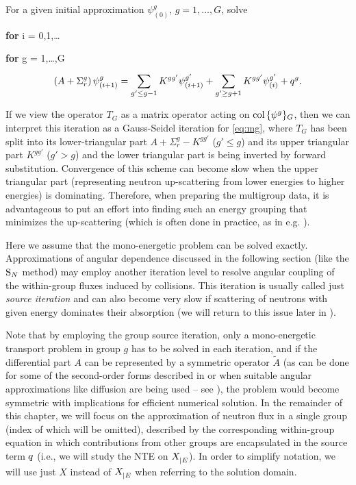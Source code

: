 For a given
initial approximation $\psi^g_{(0)}$, $g = 1,\ldots,G$, solve
\begin{myitemize}
  \item \textbf{for} i = 0,1,\ldots
  \begin{myitemize}
  \item \textbf{for} g = 1,\ldots,G
  \vspace*{-.5em}
	\begin{equation}\label{eq:MGGS}
		\left(A + \Sigma_r^g\right)\psi^g_{(i+1)} = \sum_{g'\leq g-1}^{} K^{gg'}\psi^{g'}_{(i+1)} + \sum_{g' \geq g+1}^{}
	  K^{gg'}\psi^{g'}_{(i)} + q^g.
	\end{equation}  
 \end{myitemize}
\end{myitemize}
If we view the operator $T_G$ as a matrix operator acting on $\operatorname{col\,} \{\psi^g\}_G$, then we can interpret
this iteration as a Gauss-Seidel iteration for \eqref{eq:mg}, where $T_G$
has been split into its lower-triangular part $A + \Sigma_r^g - K^{gg'}$ ($g'\leq g$) and its upper triangular part 
$K^{gg'}$ ($g'> g$) and the lower triangular part is being inverted by forward substitution. Convergence of this scheme can become slow when the upper triangular part (representing neutron up-scattering
from lower energies to higher energies) is dominating. Therefore, when preparing the multigroup data, it is
advantageous to put an effort into finding such an energy grouping that minimizes the up-scattering (which is often
done in practice, as in e.g. \cite{mox-bench}).
\begin{remark}\label{rem:SI}
Here we assume that the
mono-energetic problem can be solved exactly. Approximations of angular dependence discussed in the following
section (like the $\text{S}_{N}$ method) may employ another iteration level to resolve angular
coupling of the within-group fluxes induced by collisions. This iteration is usually called just \textit{source
iteration} and can also become very slow if scattering of neutrons with given energy dominates their absorption (we will
return to this issue later in ).
\end{remark}

Note that by employing the group source iteration, only a mono-energetic transport problem in group $g$ has to be
solved in each iteration, and if the differential part $A$ can be represented by a symmetric operator $\tilde A$ (as can be done for some of the second-order forms
described in  or when suitable angular approximations like diffusion are being
used -- see ), the problem would become symmetric with implications for efficient numerical
solution. In the remainder of this chapter, we will focus on the approximation of neutron flux in a single
group (index of which will be omitted), described by the corresponding within-group equation in which contributions from
other groups are encapsulated in the source term $q$ (i.e., we will study the NTE on $X_{\mid E}^{}$). In order to simplify
notation, we will use just $X$ instead of $X_{\mid E}^{}$ when referring to the solution domain.

